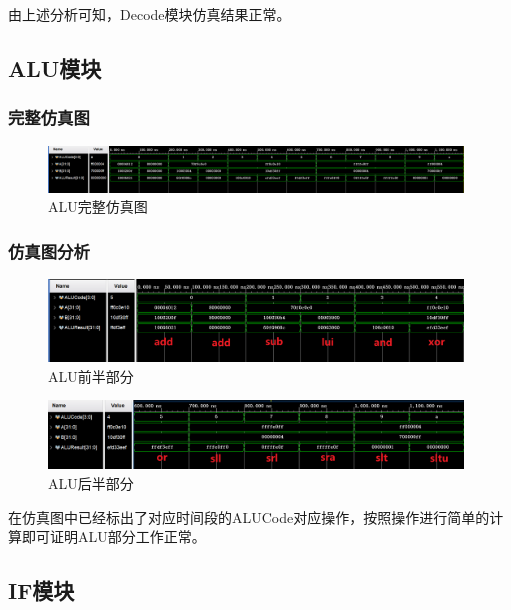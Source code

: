 \documentclass{../source/zjureport}
\begin{document}
            由上述分析可知，Decode模块仿真结果正常。


        \subsection{ALU模块}
            \subsubsection{完整仿真图}
            \begin{figure}[H]
                \centering
                \includegraphics[width = 0.98\textwidth]{figure/ALU完整仿真图.png}
                \caption{ALU完整仿真图}
            \end{figure}

            \subsubsection{仿真图分析}
            \begin{figure}[H]
                \centering
                \includegraphics[width = 0.98\textwidth]{figure/ALU_1.png}
                \caption{ALU前半部分}
            \end{figure}
            \begin{figure}[H]
                \centering
                \includegraphics[width = 0.98\textwidth]{figure/ALU_2.png}
                \caption{ALU后半部分}
            \end{figure}
            在仿真图中已经标出了对应时间段的ALUCode对应操作，按照操作进行简单的计算即可证明ALU部分工作正常。
            
        \subsection{IF模块}
\end{document}
